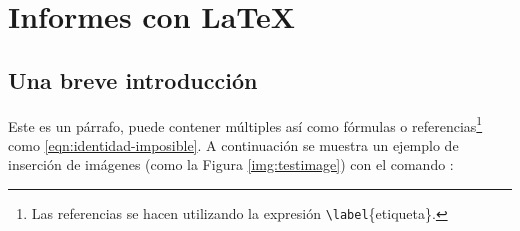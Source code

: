 %
%

\section{Informes con \LaTeX}

	\subsection{Una breve introducción}
		
		Este es un párrafo, puede contener múltiples  así como fórmulas o referencias\footnote{Las referencias se hacen utilizando la expresión \texttt{\textbackslash label}\{etiqueta\}.} como \eqref{eqn:identidad-imposible}. A continuación se muestra un ejemplo de inserción de imágenes (como la Figura \ref{img:testimage}) con el comando \href{https://latex.ppizarror.com/informe.html#hlp-imagen}{}:


